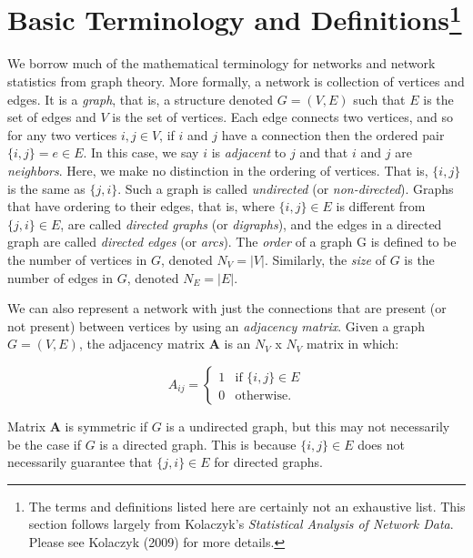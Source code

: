 \documentclass[12pt,twoside]{amherstthesis}
\begin{document}
  \section[Basic Terminology and Definitions]{\texorpdfstring{Basic
  Terminology and Definitions\footnote{The terms and definitions listed
    here are certainly not an exhaustive list. This section follows
    largely from Kolaczyk's \emph{Statistical Analysis of Network Data}.
    Please see Kolaczyk (2009) for more details.}}{Basic Terminology and Definitions}}\label{basic-terminology-and-definitions-1}
  
  We borrow much of the mathematical terminology for networks and network
  statistics from graph theory. More formally, a network is collection of
  vertices and edges. It is a \emph{graph}, that is, a structure denoted
  \(G = (V, E)\) such that \(E\) is the set of edges and \(V\) is the set
  of vertices. Each edge connects two vertices, and so for any two
  vertices \(i, j \in V\), if \(i\) and \(j\) have a connection then the
  ordered pair \(\{i, j\} = e \in E\). In this case, we say \(i\) is
  \emph{adjacent} to \(j\) and that \(i\) and \(j\) are \emph{neighbors}.
  Here, we make no distinction in the ordering of vertices. That is,
  \(\{i, j\}\) is the same as \(\{j, i\}\). Such a graph is called
  \emph{undirected} (or \emph{non-directed}). Graphs that have ordering to
  their edges, that is, where \(\{i, j\} \in E\) is different from
  \(\{j, i\} \in E\), are called \emph{directed graphs} (or
  \emph{digraphs}), and the edges in a directed graph are called
  \emph{directed edges} (or \emph{arcs}). The \emph{order} of a graph G is
  defined to be the number of vertices in \(G\), denoted \(N_V = |V|\).
  Similarly, the \emph{size} of \(G\) is the number of edges in \(G\),
  denoted \(N_E = |E|\).
  
  We can also represent a network with just the connections that are
  present (or not present) between vertices by using an \emph{adjacency
  matrix}. Given a graph \(G = (V, E)\), the adjacency matrix
  \(\textbf{A}\) is an \(N_V\) x \(N_V\) matrix in which:
  
  \[ A_{ij} = \begin{cases}
      1 & \text{if } \{i, j\} \in E \\
      0 & \text{otherwise.} 
    \end{cases}
  \]
  
  Matrix \(\textbf{A}\) is symmetric if \(G\) is a undirected graph, but
  this may not necessarily be the case if \(G\) is a directed graph. This
  is because \(\{i, j\} \in E\) does not necessarily guarantee that
  \(\{j, i\} \in E\) for directed graphs.
  
\end{document}
